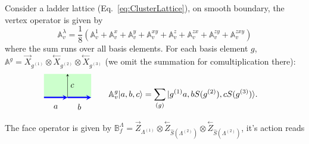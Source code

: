 \documentclass[a4paper,11pt]{article}
\theoremstyle{theorem}
\theoremstyle{remark}
\newcommand{\Av}{\mathbb{A}}
\newcommand{\Bf}{\mathbb{B}}
\newcommand{\XR}{\overset{\rightarrow}{X}}
\newcommand{\XL}{\overset{\leftarrow}{X}}
\newcommand{\ZR}{\overset{\rightarrow}{Z}}
\newcommand{\ZL}{\overset{\leftarrow}{Z}}
\newcommand{\cone}{(1)}
\newcommand{\ctwo}{(2)}
\newcommand{\cthree}{(3)}
\begin{document}
Consider a ladder lattice (Eq.~\ref{eq:ClusterLattice}), on smooth boundary, the vertex operator is given by 
\begin{equation}
    \mathbb{A}_v^{\lambda}=\frac{1}{8} ( \mathbb{A}_v^{1}+ \mathbb{A}_v^{x}+\mathbb{A}_v^{y} + \mathbb{A}_v^{xy} +\mathbb{A}_v^{z} +\mathbb{A}_v^{zx} +\mathbb{A}_v^{zy} +\mathbb{A}_v^{zxy})
\end{equation}
where the sum runs over all basis elements. For each basis element $g$, $\Av^g= \XR_{g^{\cone}} \otimes \XL_{g^{\ctwo}} \otimes \XL_{g^{\cthree}}$ (we omit the summation for comultiplication there):
\begin{align}
       \begin{aligned}
           \begin{tikzpicture}
    \begin{scope}[rotate=90] %
        \fill[green!20] (0, 0) rectangle (1,2); %
        \draw[-stealth,blue,line width = 1.6pt] (0,1) -- (0,0);
        \draw[-stealth,blue,line width = 1.6pt] (0,2) -- (0,1); 
        \draw[-stealth,black] (0,1) -- (1,1); 
       	\node[ line width=0.2pt, dashed, draw opacity=0.5] (a) at (-0.4,0.5){$b$};
    		\node[ line width=0.2pt, dashed, draw opacity=0.5] (a) at (-0.4,1.5){$a$};
            \node[ line width=0.2pt, dashed, draw opacity=0.5] (a) at (0.5,0.8){$c$};
    \end{scope}
\end{tikzpicture}
 \end{aligned} & \quad \quad \Av^{g}_{v}|a,b,c\rangle=\sum_{(g)} | g^{(1)} a, b S(g^{(2)}), c S(g^{(3)})\rangle. 
\end{align}
The face operator is given by $\Bf_f^{\Lambda}=\ZR_{\Lambda^{\cone}}\otimes \ZL_{\hat{S}(\Lambda^{\ctwo} )}  \otimes \ZL_{\hat{S}(\Lambda^{\ctwo} )}$, it's action reads
\end{document}
